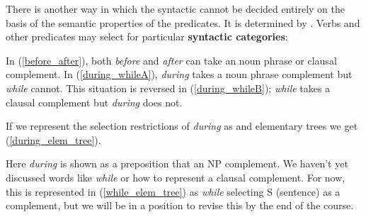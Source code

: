 \documentclass{article}
\begin{document}
There is another way in which the syntactic  cannot be decided entirely on the basis of the semantic properties of the predicates.
It is determined by .
Verbs and other predicates may select for particular \textbf{syntactic categories}:
\begin{exe}
    \label{before_after}
    \label{during_while}
\end{exe}
In (\ref{before_after}), both \emph{before} and \emph{after} can take an noun phrase or clausal complement.
In (\ref{during_whileA}), \emph{during} takes a noun phrase complement but \emph{while} cannot.
This situation is reversed in (\ref{during_whileB}); \emph{while} takes a clausal complement but \emph{during} does not.

If we represent the selection restrictions of \emph{during} as and elementary trees we get (\ref{during_elem_tree}).%
\begin{exe}
\end{exe}
Here \emph{during} is shown as a preposition that  an NP complement.
We haven't yet discussed words like \emph{while} or how to represent a clausal complement.
For now, this is represented in (\ref{while_elem_tree}) as \emph{while} selecting S (sentence) as a complement, but we will be in a position to revise this by the end of the course.
\end{document}
